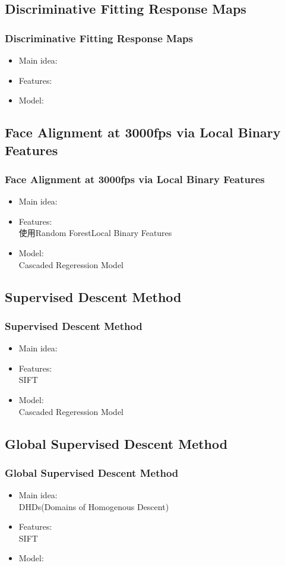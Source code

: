 \documentclass[mathserif]{beamer}%
\begin{document}
\subsection{Discriminative Fitting Response Maps}
\begin{frame}%
\frametitle{Discriminative Fitting Response Maps}
\begin{itemize}
    \item Main idea:\\
    \item Features:\\
    \item Model:\\
\end{itemize}
\end{frame}
%
\subsection{Face Alignment at 3000fps via Local Binary Features}
\begin{frame}%
\frametitle{Face Alignment at 3000fps via Local Binary Features}
\begin{itemize}
    \item Main idea:\\
    \item Features:\\%
        \zh 使用Random ForestLocal Binary Features%
    \item Model:\\
        Cascaded Regeression Model
\end{itemize}
\end{frame}
%
\subsection{Supervised Descent Method}
\label{subsec:SDM}
\begin{frame}%
\frametitle{Supervised Descent Method}
\begin{itemize}
    \item Main idea:\\
    \item Features:\\
      SIFT
    \item Model:\\
      Cascaded Regeression Model
\end{itemize}
\end{frame}
%
\subsection{Global Supervised Descent Method}
\begin{frame}%
\frametitle{Global Supervised Descent Method}
\begin{itemize}
    \item Main idea:\\
      DHDs(Domains of Homogenous Descent)
    \item Features:\\
      SIFT
    \item Model:\\
\end{itemize}
\end{frame}
%
\end{document}
